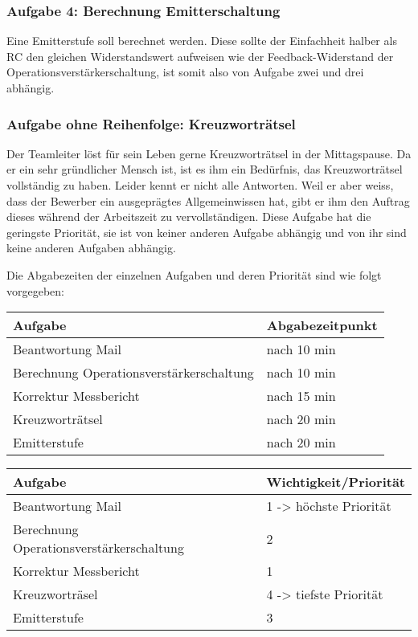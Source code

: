 \subsubsection{Aufgabe 4: Berechnung Emitterschaltung}
Eine Emitterstufe soll berechnet werden. Diese sollte der Einfachheit halber als RC den gleichen Widerstandswert aufweisen wie der Feedback-Widerstand der Operationsverstärkerschaltung, ist somit also von Aufgabe zwei und drei abhängig. 

\subsubsection{Aufgabe ohne Reihenfolge: Kreuzworträtsel}
Der Teamleiter löst für sein Leben gerne Kreuzworträtsel in der Mittagspause. Da er ein sehr gründlicher Mensch ist, ist es ihm ein Bedürfnis, das Kreuzworträtsel vollständig zu haben. Leider kennt er nicht alle Antworten. Weil er aber weiss, dass der Bewerber ein ausgeprägtes Allgemeinwissen hat, gibt er ihm den Auftrag dieses während der Arbeitszeit zu vervollständigen. Diese Aufgabe hat die geringste Priorität, sie ist von keiner anderen Aufgabe abhängig und von ihr sind keine anderen Aufgaben abhängig.

Die Abgabezeiten der einzelnen Aufgaben und deren Priorität sind wie folgt vorgegeben:
\begin{center}
  \begin{tabular}{ | p{7cm} | p{4cm} |}
   \hline
   \textbf{Aufgabe} & \textbf{Abgabezeitpunkt} \\ \hline
   Beantwortung Mail & nach 10 min \\ \hline
   Berechnung Operationsverstärkerschaltung & nach 10 min \\ \hline
   Korrektur Messbericht & nach 15 min \\ \hline
   Kreuzworträtsel & nach 20 min \\ \hline
   Emitterstufe & nach 20 min\\ \hline
  \end{tabular}
\end{center}


\begin{center}
  \begin{tabular}{ | p{7cm} | p{4cm} |}
   \hline
   \textbf{Aufgabe} & \textbf{Wichtigkeit/Priorität} \\ \hline
   Beantwortung Mail & 1 -> höchste Priorität\\ \hline
   Berechnung Operationsverstärkerschaltung & 2 \\ \hline
   Korrektur Messbericht & 1 \\ \hline
   Kreuzworträsel & 4 -> tiefste Priorität\\ \hline
   Emitterstufe & 3\\ \hline
  \end{tabular}
\end{center}


